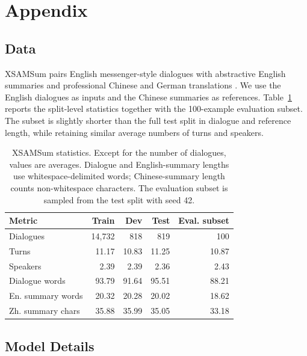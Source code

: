 \documentclass[11pt]{article}
\begin{document}
\clearpage


\appendix
\section{Appendix}

\subsection{Data}
\label{sec:appendix-data}

XSAMSum pairs English messenger-style dialogues with abstractive English summaries and professional Chinese and German translations \citep{wang-etal-2022-clidsum}. We use the English dialogues as inputs and the Chinese summaries as references. Table~\ref{tab:xsamsum-statistics} reports the split-level statistics together with the 100-example evaluation subset. The subset is slightly shorter than the full test split in dialogue and reference length, while retaining similar average numbers of turns and speakers.

\begin{table}[H]
\centering
\footnotesize
\setlength{\tabcolsep}{4pt}
\begin{tabular}{lrrrr}
\hline
Metric & Train & Dev & Test & Eval. subset \\
\hline
Dialogues         & 14{,}732 & 818   & 819   & 100 \\
Turns             & 11.17    & 10.83 & 11.25 & 10.87 \\
Speakers          & 2.39     & 2.39  & 2.36  & 2.43 \\
Dialogue words    & 93.79    & 91.64 & 95.51 & 88.21 \\
En. summary words & 20.32    & 20.28 & 20.02 & 18.62 \\
Zh. summary chars & 35.88    & 35.99 & 35.05 & 33.18 \\
\hline
\end{tabular}
\caption{XSAMSum statistics. Except for the number of dialogues, values are averages. Dialogue and English-summary lengths use whitespace-delimited words; Chinese-summary length counts non-whitespace characters. The evaluation subset is sampled from the test split with seed 42.}
\label{tab:xsamsum-statistics}
\end{table}

\subsection{Model Details}
\label{sec:appendix-model-details}
\end{document}
